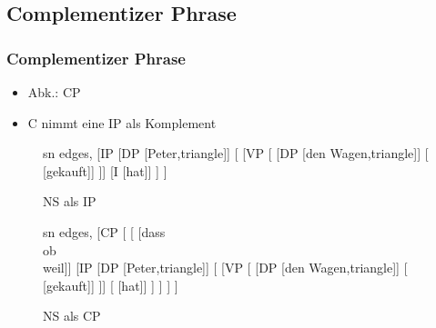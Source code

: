 \subsection{Complementizer Phrase}

\begin{frame}
\frametitle{Complementizer Phrase}

\begin{itemize}
	\item Abk.: CP
	\item C nimmt eine IP als Komplement
\end{itemize}

\begin{figure}[b]
	\begin{minipage}[b]{0.45\textwidth}
	\centering
	\tiny{
		\begin{forest}
		sn edges,
		[IP [DP [Peter,triangle]]
			[ [VP 
					[ [DP [den Wagen,triangle]]
						[ [gekauft]]
						]]
				[I [hat]]
				]
		]
		\end{forest}
		}
		\caption{NS als IP}	
  	\end{minipage}  
  	\begin{minipage}[b]{0.05\textwidth}
	\hfill
	\end{minipage}  
	\begin{minipage}[b]{0.45\textwidth}
	\centering
	\tiny{
		\begin{forest}
		sn edges,
[CP	[	[ [\alert{dass}\\ \alert{ob}\\ \alert{weil}]]	
		[IP [DP [Peter,triangle]]
			[\MyPxbar{I} [VP
					[ [DP [den Wagen,triangle]]
						[\zerobar{V} [gekauft]]
						]]
				[\zerobar{I} [hat]]
				]
		]
	]
]
		\end{forest}
		}
		\caption{NS als CP}	
  	\end{minipage}  
\end{figure}

\end{frame}


